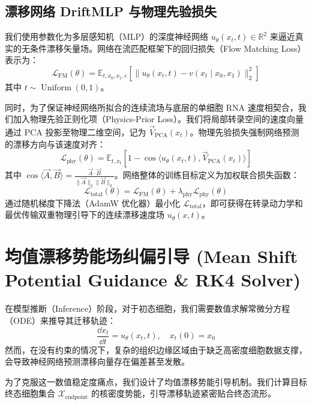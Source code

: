 \subsection{漂移网络 DriftMLP 与物理先验损失}
我们使用参数化为多层感知机（MLP）的深度神经网络 $u_\theta(x_t, t) \in \mathbb{R}^2$ 来逼近真实的无条件漂移矢量场。网络在流匹配框架下的回归损失（Flow Matching Loss）表示为：
\begin{equation}
    \mathcal{L}_{\text{FM}}(\theta) = \mathbb{E}_{t, x_0, x_1, \epsilon} \left[ \| u_\theta(x_t, t) - v(x_t \mid x_0, x_1) \|_2^2 \right]
\end{equation}
其中 $t \sim \operatorname{Uniform}(0, 1)$。

同时，为了保证神经网络所拟合的连续流场与底层的单细胞 RNA 速度相契合，我们加入物理先验正则化项（Physics-Prior Loss）。我们将局部转录空间的速度向量通过 PCA 投影至物理二维空间，记为 $\vec{V}_{\text{PCA}}(x_t)$。物理先验损失强制网络预测的漂移方向与该速度对齐：
\begin{equation}
    \mathcal{L}_{\text{phy}}(\theta) = \mathbb{E}_{t, x_t} \left[ 1 - \cos \langle u_\theta(x_t, t), \vec{V}_{\text{PCA}}(x_t) \rangle \right]
\end{equation}
其中 $\cos \langle \vec{A}, \vec{B} \rangle = \frac{\vec{A} \cdot \vec{B}}{\|\vec{A}\|_2 \|\vec{B}\|_2}$。网络整体的训练目标定义为加权联合损失函数：
\begin{equation}
    \mathcal{L}_{\text{total}}(\theta) = \mathcal{L}_{\text{FM}}(\theta) + \lambda_{\text{phy}} \mathcal{L}_{\text{phy}}(\theta)
\end{equation}
通过随机梯度下降法（AdamW 优化器）最小化 $\mathcal{L}_{\text{total}}$，即可获得在转录动力学和最优传输双重物理引导下的连续漂移速度场 $u_\theta(x, t)$。

\section{均值漂移势能场纠偏引导 (Mean Shift Potential Guidance \& RK4 Solver)}
在模型推断（Inference）阶段，对于初态细胞，我们需要数值求解常微分方程（ODE）来推导其迁移轨迹：
\begin{equation}
    \frac{\dd x_t}{\dd t} = u_\theta(x_t, t), \quad x_t(0) = x_0
\end{equation}
然而，在没有约束的情况下，复杂的组织边缘区域由于缺乏高密度细胞数据支撑，会导致神经网络预测漂移向量存在偏差甚至发散。

为了克服这一数值稳定度痛点，我们设计了均值漂移势能引导机制。我们计算目标终态细胞集合 $\mathcal{X}_{\text{endpoint}}$ 的核密度势能，引导漂移轨迹紧密贴合终态流形。

